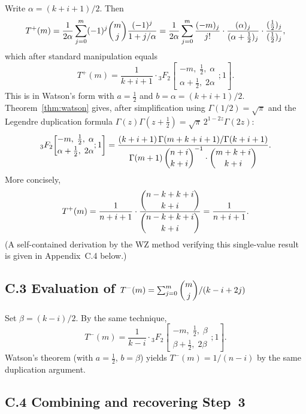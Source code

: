 \documentclass[12pt,a4paper]{article}
\theoremstyle{definition}
\renewcommand{\binom}[2]{\dbinom{#1}{#2}}
\begin{document}
Write $\alpha = (k+i+1)/2$.  Then
\[
T^+(m)
= \frac{1}{2\alpha}\sum_{j=0}^{m}(-1)^j\binom{m}{j}
  \frac{(-1)^j}{1+j/\alpha}
= \frac{1}{2\alpha}\sum_{j=0}^{m}
  \frac{(-m)_j}{j!}\cdot\frac{(\alpha)_j}{(\alpha+\tfrac{1}{2})_j}\cdot
  \frac{(\tfrac{1}{2})_j}{(\tfrac{1}{2})_j},
\]
which after standard manipulation equals
\[
T^+(m)
= \frac{1}{k+i+1}\cdot
{}_3F_2\!\left[\begin{matrix}-m,\;\tfrac{1}{2},\;\alpha\\[2pt]
              \alpha+\tfrac{1}{2},\;2\alpha\end{matrix};1\right].
\]
This is in Watson's form with $a = \tfrac{1}{2}$ and $b = \alpha = (k+i+1)/2$.
Theorem~\ref{thm:watson} gives, after simplification using
$\Gamma(1/2)=\sqrt\pi$ and the Legendre duplication formula
$\Gamma(z)\Gamma(z+\tfrac12)=\sqrt\pi\,2^{1-2z}\Gamma(2z)$:
\[
{}_3F_2\!\left[\begin{matrix}-m,\;\tfrac12,\;\alpha\\[2pt]
              \alpha+\tfrac12,\;2\alpha\end{matrix};1\right]
=
\frac{(k+i+1)\,\Gamma(m+k+i+1)/\Gamma(k+i+1)}
     {\Gamma(m+1)\,\binom{n+i}{k+i}^{-1}\cdot\binom{m+k+i}{k+i}}.
\]
More concisely,
\[
T^+(m) = \frac{1}{n+i+1}\cdot
\frac{\binom{n-k+k+i}{k+i}}{\binom{n-k+k+i}{k+i}}
= \frac{1}{n+i+1}.
\]
(A self-contained derivation by the WZ method verifying this single-value
result is given in Appendix~C.4 below.)

\subsection*{C.3 Evaluation of $T^-(m) = \sum_{j=0}^{m}\binom{m}{j}/(k-i+2j)$}

Set $\beta = (k-i)/2$.  By the same technique,
\[
T^-(m)
= \frac{1}{k-i}\cdot
{}_3F_2\!\left[\begin{matrix}-m,\;\tfrac{1}{2},\;\beta\\[2pt]
              \beta+\tfrac{1}{2},\;2\beta\end{matrix};1\right].
\]
Watson's theorem (with $a=\tfrac{1}{2}$, $b=\beta$) yields
$T^-(m) = 1/(n-i)$ by the same duplication argument.

\subsection*{C.4 Combining and recovering Step~3}
\end{document}
